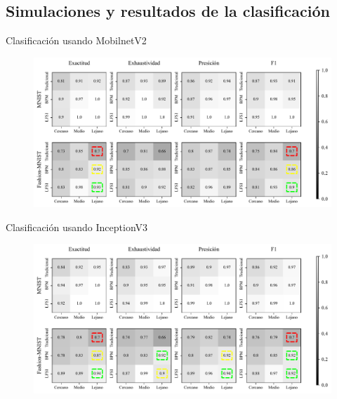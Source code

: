 \documentclass[aspectratio=169,t,xcolor=table]{beamer}
\begin{document}
\subsection{Simulaciones y resultados de la clasificación}

\begin{frame}{Clasificación usando MobilnetV2}
\scriptsize
    \begin{figure}
        \centering
        \includegraphics[width=\linewidth]{images/resultados/test_result_mobilnet.pdf}
    \end{figure}
\end{frame}

\begin{frame}{Clasificación usando InceptionV3}
\scriptsize
    \begin{figure}
        \centering
        \includegraphics[width=\linewidth]{images/resultados/test_result_inception.pdf}
    \end{figure}
\end{frame}
\end{document}
